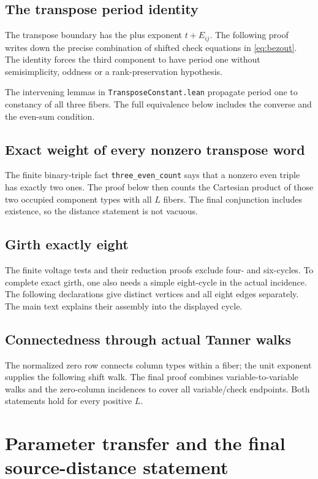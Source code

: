 \subsection{The transpose period identity}
The transpose boundary has the plus exponent $t+E_{ij}$. The following
proof writes down the precise combination of shifted check equations in
\eqref{eq:bezout}. The identity forces the third component to have period
one without semisimplicity, oddness or a rank-preservation hypothesis.

The intervening lemmas in \nolinkurl{TransposeConstant.lean} propagate
period one to constancy of all three fibers. The full equivalence below
includes the converse and the even-sum condition.

\subsection{Exact weight of every nonzero transpose word}
The finite binary-triple fact \texttt{three\_even\_count} says that a
nonzero even triple has exactly two ones. The proof below then counts
the Cartesian product of those two occupied component types with all
$L$ fibers. The final conjunction includes existence, so the distance
statement is not vacuous.

\subsection{Girth exactly eight}
The finite voltage tests and their reduction proofs exclude four- and
six-cycles. To complete exact girth, one also needs a simple eight-cycle
in the actual incidence. The following declarations give distinct
vertices and all eight edges separately. The main text explains their
assembly into the displayed cycle.

\subsection{Connectedness through actual Tanner walks}
The normalized zero row connects column types within a fiber; the unit
exponent supplies the following shift walk. The final proof combines
variable-to-variable walks and the zero-column incidences to cover all
variable/check endpoints. Both statements hold for every positive $L$.

\clearpage
\section{Parameter transfer and the final source-distance statement}\label{app:lean-assembly}

